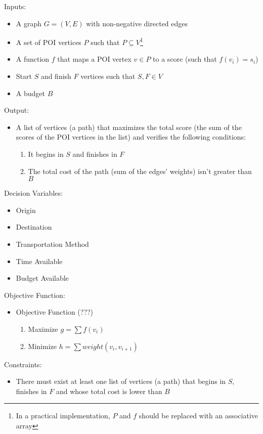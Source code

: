 \documentclass{article}
\begin{document}
\noindent
Inputs:
\begin{itemize}
    \item A graph $G = (V, E)$ with non-negative directed edges
    \item A set of POI vertices $P$ such that $P \subseteq V$\footnote{In a practical implementation, $P$ and $f$ should be replaced with an associative array}
    \item A function $f$ that maps a POI vertex $v \in P$ to a score (such that $f(v_{i}) = s_{i}$)
    \item Start $S$ and finish $F$ vertices such that $S, F \in V$
    \item A budget $B$
\end{itemize}

\noindent
Output:
\begin{itemize}
    \item A list of vertices (a path) that maximizes the total score (the sum of the scores of the POI vertices in the list) and verifies the following conditions:
    \begin{enumerate}
        \item It begins in $S$ and finishes in $F$
        \item The total cost of the path (sum of the edges' weights) isn't greater than $B$
    \end{enumerate} 
\end{itemize}

\noindent
Decision Variables:
\begin{itemize}
    \item Origin
    \item Destination
    \item Transportation Method
    \item Time Available
    \item Budget Available
\end{itemize}

\noindent
Objective Function:
\begin{itemize}
    \item Objective Function (???)
    \begin{enumerate}
        \item Maximize $g = \sum f(v_i)$
        \item Minimize $h = \sum weight(v_i, v_{i+1})$
    \end{enumerate}
\end{itemize}

\noindent
Constraints:
\begin{itemize}
    \item There must exist at least one list of vertices (a path) that begins in $S$, finishes in $F$ and whose total cost is lower than $B$
\end{itemize}
\end{document}

